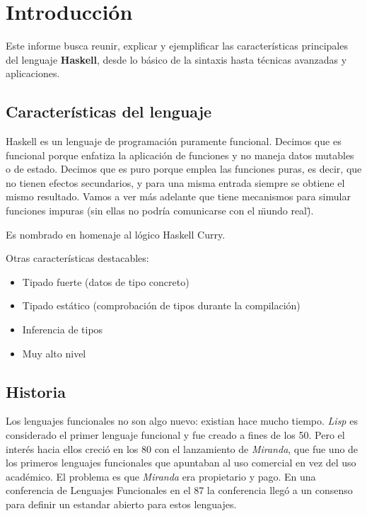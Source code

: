 \section{Introducción} %
\label{sec:introducci_n}

Este informe busca reunir, explicar y ejemplificar las características principales del lenguaje \textbf{Haskell}, desde lo básico de la sintaxis hasta técnicas avanzadas y aplicaciones.

\subsection{Características del lenguaje} %
\label{sub:caracter_sticas_del_lenguaje}

Haskell es un lenguaje de programación puramente funcional. Decimos que es funcional porque enfatiza la aplicación de funciones y no maneja datos mutables o de estado. Decimos que es puro porque emplea las funciones puras, es decir, que no tienen efectos secundarios, y para una misma entrada siempre se obtiene el mismo resultado. Vamos a ver más adelante que tiene mecanismos para simular funciones impuras (sin ellas no podría comunicarse con el \"mundo real\").

Es nombrado en homenaje al lógico Haskell Curry.

Otras características destacables:

\begin{itemize}
  \item Tipado fuerte (datos de tipo concreto)
  \item Tipado estático (comprobación de tipos durante la compilación)
  \item Inferencia de tipos
  \item Muy alto nivel
\end{itemize}

\subsection{Historia} %
\label{sub:historia}

Los lenguajes funcionales no son algo nuevo: existian hace mucho tiempo. \textit{Lisp} es considerado el primer lenguaje funcional y fue creado a fines de los 50. Pero el interés hacia ellos creció en los 80 con el lanzamiento de \textit{Miranda}, que fue uno de los primeros lenguajes funcionales que apuntaban al uso comercial en vez del uso académico. El problema es que \textit{Miranda} era propietario y pago. En una conferencia de Lenguajes Funcionales en el 87 la conferencia llegó a un consenso para definir un estandar abierto para estos lenguajes.

